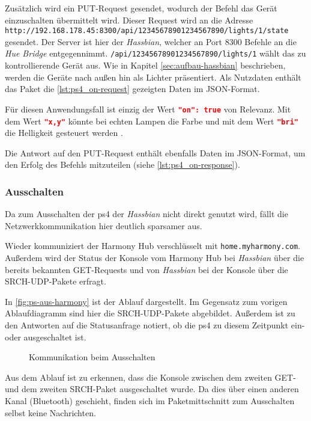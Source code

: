 Zusätzlich wird ein PUT-Request gesendet, wodurch der Befehl das Gerät einzuschalten übermittelt wird.
Dieser Request wird an die Adresse \nolinkurl{http://192.168.178.45:8300/api/12345678901234567890/lights/1/state} gesendet.
Der Server ist hier der \textit{Hassbian}, welcher an Port 8300 Befehle an die \textit{Hue Bridge} entgegennimmt.
\texttt{/api/12345678901234567890/lights/1} wählt das zu kontrollierende Gerät aus.
Wie in Kapitel \ref{sec:aufbau-hassbian} \textit{} beschrieben, werden die Geräte nach außen hin als Lichter präsentiert.
Als Nutzdaten enthält das Paket die \autoref{lst:ps4_on-request} gezeigten Daten im JSON-Format.

Für diesen Anwendungsfall ist einzig der Wert \lstinline[language=json]{"on": true} von Relevanz.
Mit dem Wert \lstinline[language=json]{"x,y"} könnte bei echten Lampen die Farbe
und mit dem Wert \lstinline[language=json]{"bri"} die Helligkeit gesteuert werden \cite{Coreconc26:online}.

Die Antwort auf den PUT-Request enthält ebenfalls Daten im JSON-Format,
um den Erfolg des Befehls mitzuteilen (siehe \autoref{lst:ps4_on-response}).



\subsubsection{Ausschalten}

Da zum Ausschalten der \ac{ps4} der \textit{Hassbian} nicht direkt genutzt wird,
fällt die Netzwerkkommunikation hier deutlich sparsamer aus.

Wieder kommuniziert der Harmony Hub verschlüsselt mit \nolinkurl{home.myharmony.com}.
Außerdem wird der Status der Konsole vom Harmony Hub bei \textit{Hassbian} über die bereits bekannten GET-Requests
und von \textit{Hassbian} bei der Konsole über die SRCH-UDP-Pakete erfragt.

In \autoref{fig:ps-aus-harmony} ist der Ablauf dargestellt.
Im Gegensatz zum vorigen Ablaufdiagramm sind hier die SRCH-UDP-Pakete abgebildet.
Außerdem ist zu den Antworten auf die Statusanfrage notiert,
ob die \ac{ps4} zu diesem Zeitpunkt ein- oder ausgeschaltet ist.


\begin{figure}[ht!]
    \centering
    \resizebox{\textwidth}{!}{
        
    }
    \caption{Kommunikation beim Ausschalten}
    \label{fig:ps-aus-harmony}
\end{figure}

Aus dem Ablauf ist zu erkennen,
dass die Konsole zwischen dem zweiten GET- und dem zweiten SRCH-Paket ausgeschaltet wurde.
Da dies über einen anderen Kanal (Bluetooth) geschieht,
finden sich im Paketmittschnitt zum Ausschalten selbst keine Nachrichten.